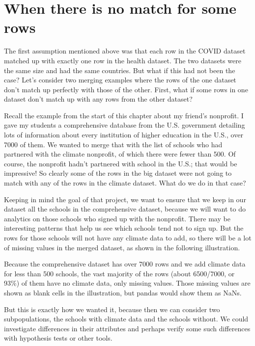 \documentclass[letterpaper,10pt,english]{sphinxmanual}
\begin{document}
\section{When there is no match for some rows}
\label{\detokenize{chapter-12-concat-and-merge:when-there-is-no-match-for-some-rows}}
The first assumption mentioned above was that each row in the COVID dataset matched up with exactly one row in the health dataset.  The two datasets were the same size and had the same countries.  But what if this had not been the case?  Let’s consider two merging examples where the rows of the one dataset don’t match up perfectly with those of the other.  First, what if some rows in one dataset don’t match up with any rows from the other dataset?

Recall the example from the start of this chapter about my friend’s nonprofit.  I gave my students a comprehensive database from the U.S. government detailing lots of information about every institution of higher education in the U.S., over 7000 of them.  We wanted to merge that with the list of schools who had partnered with the climate nonprofit, of which there were fewer than 500.  Of course, the nonprofit hadn’t partnered with  school in the U.S.; that would be impressive!  So clearly some of the rows in the big dataset were not going to match with any of the rows in the climate dataset.  What do we do in that case?

Keeping in mind the goal of that project, we want to ensure that we keep in our dataset all the schools in the comprehensive dataset, because we will want to do analytics on those schools who  signed up with the nonprofit.  There may be interesting patterns that help us see which schools tend not to sign up.  But the rows for those schools will not have any climate data to add, so there will be a lot of missing values in the merged dataset, as shown in the following illustration.


Because the comprehensive dataset has over 7000 rows and we add climate data for less than 500 schools, the vast majority of the rows (about 6500/7000, or 93\%) of them have no climate data, only missing values.  Those missing values are shown as blank cells in the illustration, but pandas would show them as NaNs.

But this is exactly how we wanted it, because then we can consider two subpopulations, the schools with climate data and the schools without.  We could investigate differences in their attributes and perhaps verify some such differences with hypothesis tests or other tools.
\end{document}
